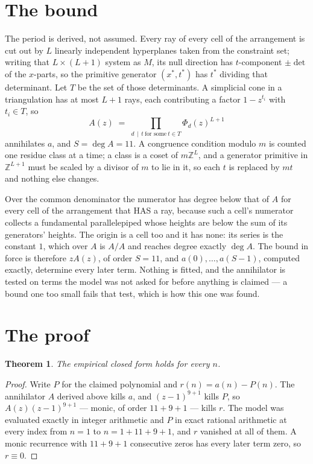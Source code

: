 \documentclass[11pt,a4paper]{article}
\theoremstyle{plain}
\newtheorem{theorem}{Theorem}
\theoremstyle{definition}
\begin{document}
\section{The bound}

The period is derived, not assumed. Every ray of every cell of the arrangement is cut out by
$L$ linearly independent hyperplanes taken from the constraint set; writing that $L\times(L+1)$
system as $M$, its null direction has $t$-component $\pm\det$ of the $x$-parts, so the
primitive generator $(x^*,t^*)$ has $t^*$ dividing that determinant. Let $T$ be the set of
those determinants. A simplicial cone in a triangulation has at most $L+1$ rays, each
contributing a factor $1-z^{t_i}$ with $t_i\in T$, so
\[
A(z)\;=\;\prod_{d\,\mid\,t\ \text{for some}\ t\in T}\Phi_d(z)^{L+1}
\]
annihilates $a$, and $S=\deg A=11$. A congruence condition modulo $m$ is counted one residue
class at a time; a class is a coset of $m\mathbb{Z}^L$, and a generator primitive in
$\mathbb{Z}^{L+1}$ must be scaled by a divisor of $m$ to lie in it, so each $t$ is replaced
by $mt$ and nothing else changes.

Over the common denominator the numerator has degree below that of $A$ for every cell of the
arrangement that HAS a ray, because such a cell's numerator collects a fundamental
parallelepiped whose heights are below the sum of its generators' heights. The origin is a cell
too and it has none: its series is the constant $1$, which over $A$ is $A/A$ and reaches degree
exactly $\deg A$. The bound in force is therefore $zA(z)$, of order $S=11$, and
$a(0),\dots,a(S-1)$, computed exactly, determine every later term. Nothing is fitted, and the
annihilator is tested on terms the model was not asked for before anything is claimed --- a
bound one too small fails that test, which is how this one was found.

\section{The proof}

\begin{theorem}
The empirical closed form holds for every $n$.
\end{theorem}

\begin{proof}
Write $P$ for the claimed polynomial and $r(n)=a(n)-P(n)$. The annihilator $A$ derived above
kills $a$, and $(z-1)^{9+1}$ kills $P$, so $A(z)(z-1)^{9+1}$ --- monic, of order
$11+9+1$ --- kills $r$. The model was evaluated exactly in integer arithmetic and $P$ in
exact rational arithmetic at every index from $n=1$ to $n=1+11+9+1$, and $r$ vanished
at all of them. A monic recurrence with $11+9+1$ consecutive zeros has every later term zero,
so $r\equiv0$.
\end{proof}
\end{document}
